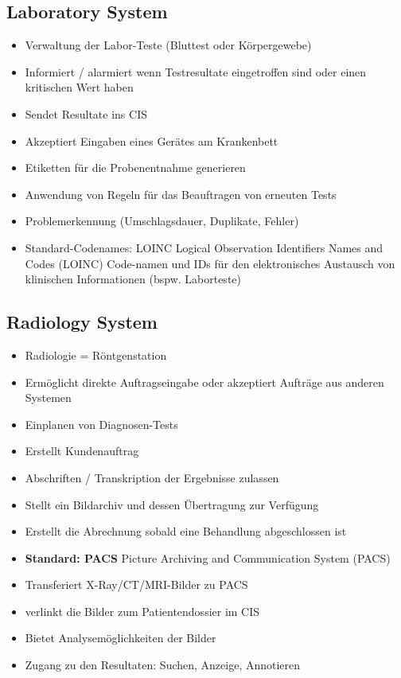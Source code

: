 \documentclass{report}
\theoremstyle{definition}
\theoremstyle{example}
\begin{document}
\subsection{Laboratory System}
\begin{itemize}
   \item Verwaltung der Labor-Teste (Bluttest oder Körpergewebe)
   \item Informiert / alarmiert wenn Testresultate eingetroffen sind oder einen kritischen Wert haben
   \item Sendet Resultate ins CIS
   \item Akzeptiert Eingaben eines Gerätes am Krankenbett
   \item Etiketten für die Probenentnahme generieren
   \item Anwendung von Regeln für das Beauftragen von erneuten Tests
   \item Problemerkennung (Umschlagsdauer, Duplikate, Fehler)
   \item Standard-Codenames: LOINC
   \subitem Logical Observation Identifiers Names and Codes (LOINC)
   \subitem Code-namen und IDs für den elektronisches Austausch von klinischen Informationen (bspw. Laborteste)  
\end{itemize}

\subsection{Radiology System}
\begin{itemize}
   \item Radiologie = Röntgenstation
   \item Ermöglicht direkte Auftragseingabe oder akzeptiert Aufträge aus anderen Systemen
   \item Einplanen von Diagnosen-Tests
   \item Erstellt Kundenauftrag
   \item Abschriften / Transkription der Ergebnisse zulassen
   \item Stellt ein Bildarchiv und dessen Übertragung zur Verfügung
   \item Erstellt die Abrechnung sobald eine Behandlung abgeschlossen ist
   \item \textbf{Standard: PACS}
   \subitem Picture Archiving and Communication System (PACS)
   \item Transferiert X-Ray/CT/MRI-Bilder zu PACS
   \item verlinkt die Bilder zum Patientendossier im CIS
   \item Bietet Analysemöglichkeiten der Bilder
   \item Zugang zu den Resultaten: Suchen, Anzeige, Annotieren
\end{itemize}
\end{document}
